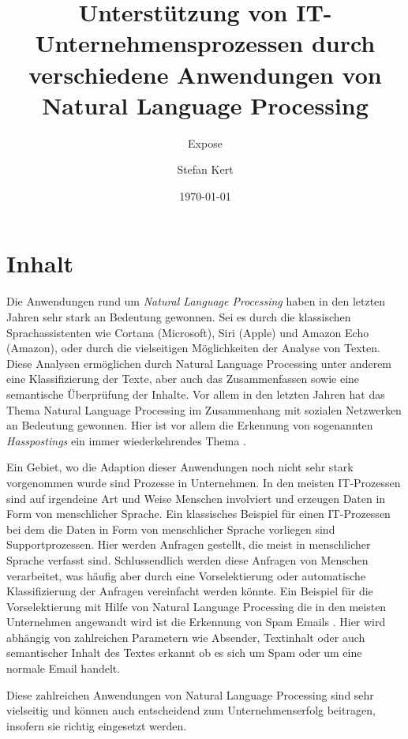 \documentclass[a4paper]{scrartcl}
\begin{document}
\title{Unterstützung von IT-Unternehmensprozessen durch verschiedene Anwendungen von Natural Language Processing}
\subtitle{Expose}
\author{Stefan Kert}
\date{\today}
\maketitle

\section{Inhalt}
Die Anwendungen rund um \textit{Natural Language Processing} haben in den letzten Jahren sehr stark an Bedeutung gewonnen. Sei es durch die klassischen Sprachassistenten wie Cortana (Microsoft), Siri (Apple) und Amazon Echo (Amazon), oder durch die vielseitigen Möglichkeiten der Analyse von Texten. Diese Analysen ermöglichen durch Natural Language Processing unter anderem eine Klassifizierung der Texte, aber auch das Zusammenfassen sowie eine semantische Überprüfung der Inhalte. Vor allem in den letzten Jahren hat das Thema Natural Language Processing im Zusammenhang mit sozialen Netzwerken an Bedeutung gewonnen. Hier ist vor allem die Erkennung von sogenannten \textit{Hasspostings} ein immer wiederkehrendes Thema \cite{Nobata2016}. 

Ein Gebiet, wo die Adaption dieser Anwendungen noch nicht sehr stark vorgenommen wurde sind Prozesse in Unternehmen. In den meisten IT-Prozessen sind auf irgendeine Art und Weise Menschen involviert und erzeugen Daten in Form von menschlicher Sprache. Ein klassisches Beispiel für einen IT-Prozessen bei dem die Daten in Form von menschlicher Sprache vorliegen sind Supportprozessen. Hier werden Anfragen gestellt, die meist in menschlicher Sprache verfasst sind. Schlussendlich werden diese Anfragen von Menschen verarbeitet, was häufig aber durch eine Vorselektierung oder automatische Klassifizierung der Anfragen vereinfacht werden könnte. Ein Beispiel für die Vorselektierung mit Hilfe von Natural Language Processing die in den meisten Unternehmen angewandt wird ist die Erkennung von Spam Emails \cite{Dinsoreanu2014}. Hier wird abhängig von zahlreichen Parametern wie Absender, Textinhalt oder auch semantischer Inhalt des Textes erkannt ob es sich um Spam oder um eine normale Email handelt.

Diese zahlreichen Anwendungen von Natural Language Processing sind sehr vielseitig und können auch entscheidend zum Unternehmenserfolg beitragen, insofern sie richtig eingesetzt werden.
\end{document}
